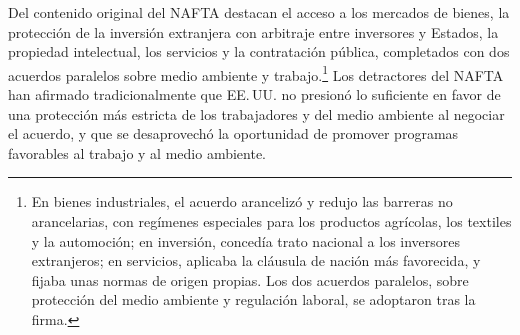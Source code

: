 \documentclass[10pt,a4paper]{article}
\begin{document}
Del contenido original del NAFTA destacan el acceso a los mercados de bienes, la protección de la inversión extranjera con arbitraje entre inversores y Estados, la propiedad intelectual, los servicios y la contratación pública, completados con dos acuerdos paralelos sobre medio ambiente y trabajo.\footnote{%
    En bienes industriales, el acuerdo arancelizó y redujo las barreras no arancelarias, con regímenes especiales para los productos agrícolas, los textiles y la automoción; en inversión, concedía trato nacional a los inversores extranjeros; en servicios, aplicaba la cláusula de nación más favorecida, y fijaba unas normas de origen propias. Los dos acuerdos paralelos, sobre protección del medio ambiente y regulación laboral, se adoptaron tras la firma.
} Los detractores del NAFTA han afirmado tradicionalmente que EE.\,UU. no presionó lo suficiente en favor de una protección más estricta de los trabajadores y del medio ambiente al negociar el acuerdo, y que se desaprovechó la oportunidad de promover programas favorables al trabajo y al medio ambiente.
\end{document}
